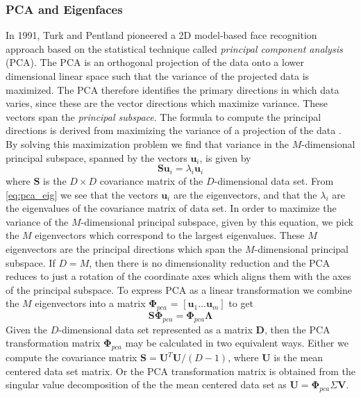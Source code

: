 \documentclass[11pt,a4paper,twoside]{report}
\begin{document}
\subsubsection{PCA and Eigenfaces}
In 1991, Turk and Pentland \cite{eigenfaces91} pioneered a 2D model-based face recognition approach
based on the statistical
technique called \textit{principal component analysis} (PCA). The PCA is an orthogonal
projection of the data onto a lower dimensional linear space such that the
variance of the projected data is maximized. The PCA therefore
identifies the primary directions in which data varies, since these are the
vector directions which maximize variance. These vectors span
the \textit{principal subspace}. The formula to compute the principal directions
is derived from maximizing the variance of a projection of the data
\cite{bishop}. By solving this maximization problem we find that variance in the
$M$-dimensional principal subspace, spanned by the vectors $\mathbf{u}_i$, is given by
\begin{equation}\label{eq:pca_eig}
\mathbf{S}\mathbf{u}_i = \lambda_i \mathbf{u}_i
\end{equation}
where $\mathbf{S}$ is the $D \times D$ covariance matrix of the $D$-dimensional
data set. From \ref{eq:pca_eig} we see that the vectors $\mathbf{u}_i$ are the
eigenvectors, and that the $\lambda_i$ are the eigenvalues of the covariance matrix of
data set. In order to maximize the variance of the $M$-dimensional principal subspace, given by
this equation, we pick the $M$ eigenvectors which correspond to the largest
eigenvalues. These $M$ eigenvectors are the principal directions which span the
$M$-dimensional principal subspace. If $D = M$, then there is no
dimensionality reduction and the PCA reduces to just a rotation
of the coordinate axes which aligns them with the axes of the principal subspace.  
To express PCA as a linear transformation we combine the $M$ eigenvectors into a
matrix $\mathbf{\Phi}_{pca}$ = $[\mathbf{u}_1 \ldots \mathbf{u}_m]$ to get
\begin{equation}\label{eq:pca}
\mathbf{S}\mathbf{\Phi}_{pca} = \mathbf{\Phi}_{pca}\mathbf{\Lambda}
\end{equation}
Given the $D$-dimensional data set represented as a matrix $\mathbf{D}$, then
the PCA transformation matrix $\mathbf{\Phi}_{pca}$ may be calculated in two
equivalent ways. Either we compute the covariance matrix $\mathbf{S} =
\mathbf{U}^T\mathbf{U} / (D-1)$, where $\mathbf{U}$ is the mean centered data set
matrix. Or the PCA transformation matrix is obtained from the singular value
decomposition of the the mean centered data set as
$\mathbf{U} = \mathbf{\Phi}_{pca}\Sigma\mathbf{V}$. 
\end{document}
